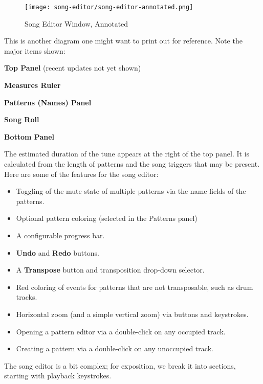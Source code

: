 \begin{figure}[H]
   \centering 
   \texttt{[image: song-editor/song-editor-annotated.png]}
   \caption{Song Editor Window, Annotated}
   \label{fig:song_editor_window_annotated}
\end{figure}

   This is another diagram one might want to print out for reference.
   Note the major items shown:

   \begin{enumber}
      \item \textbf{Top Panel} (recent updates not yet shown)
      \item \textbf{Measures Ruler}
      \item \textbf{Patterns (Names) Panel}
      \item \textbf{Song Roll}
      \item \textbf{Bottom Panel}
   \end{enumber}

   The estimated duration of the tune appears at the right of the top panel.
   It is calculated from the length of patterns
   and the song triggers that may be present.
   Here are some of the features for the song editor:

   \begin{itemize}
      \item Toggling of the mute state of multiple patterns
         via the name fields of the patterns.
      \item Optional pattern coloring (selected in the Patterns panel)
      \item A configurable progress bar.
      \item \textbf{Undo} and \textbf{Redo} buttons.
      \item A \textbf{Transpose} button and transposition drop-down selector.
      \item Red coloring of events for patterns that are not transposable,
         such as drum tracks.
      \item Horizontal zoom (and a simple vertical zoom)
      via buttons and keystrokes.
      \item Opening a pattern editor via a double-click on any occupied
         track.
      \item Creating a pattern via a double-click on any unoccupied track.
   \end{itemize}

   The song editor is a bit complex; for exposition, we break it into
   sections, starting with playback keystrokes.


